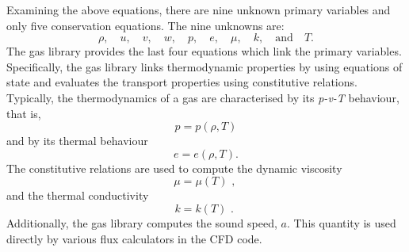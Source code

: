 Examining the above equations, there are nine unknown primary variables and only 
five conservation equations.
The nine unknowns are:
\[ \rho,\quad  u,\quad  v,\quad w,\quad p,\quad e,\quad \mu,\quad k,\quad \text{and}\quad T. \]
The gas library provides the last four equations which link the primary
variables.
Specifically, the gas library links thermodynamic properties
by using equations of state and evaluates the transport properties
using constitutive relations.
Typically, the thermodynamics of a gas are characterised by its
\textit{p-v-T} behaviour, that is,
\begin{equation}
   p = p(\rho, T)
\end{equation}
and by its thermal behaviour
\begin{equation}
   e = e(\rho, T) \text{.}
\end{equation}
The constitutive relations are used to compute the dynamic viscosity
\begin{equation}
 \mu = \mu(T) \text{ , }
\end{equation}
and the thermal conductivity
\begin{equation}
 k = k(T) \text{ . }
\end{equation}
Additionally, the gas library computes the sound speed, $a$.
This quantity is used directly by various flux calculators in
the CFD code.


